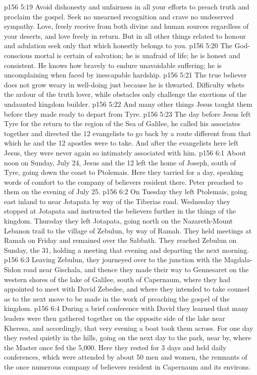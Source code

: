 \vs p156 5:19 Avoid dishonesty and unfairness in all your efforts to preach truth and proclaim the gospel. Seek no unearned recognition and crave no undeserved sympathy. Love, freely receive from both divine and human sources regardless of your deserts, and love freely in return. But in all other things related to honour and adulation seek only that which honestly belongs to you.
\vs p156 5:20 The God\hyp{}conscious mortal is certain of salvation; he is unafraid of life; he is honest and consistent. He knows how bravely to endure unavoidable suffering; he is uncomplaining when faced by inescapable hardship.
\vs p156 5:21 The true believer does not grow weary in well\hyp{}doing just because he is thwarted. Difficulty whets the ardour of the truth lover, while obstacles only challenge the exertions of the undaunted kingdom builder.
\vs p156 5:22 \pc And many other things Jesus taught them before they made ready to depart from Tyre.
\vs p156 5:23 The day before Jesus left Tyre for the return to the region of the Sea of Galilee, he called his associates together and directed the 12 evangelists to go back by a route different from that which he and the 12 apostles were to take. And after the evangelists here left Jesus, they were never again so intimately associated with him.
\vs p156 6:1 About noon on Sunday, July 24, Jesus and the 12 left the home of Joseph, south of Tyre, going down the coast to Ptolemais. Here they tarried for a day, speaking words of comfort to the company of believers resident there. Peter preached to them on the evening of July 25.
\vs p156 6:2 On Tuesday they left Ptolemais, going east inland to near Jotapata by way of the Tiberias road. Wednesday they stopped at Jotapata and instructed the believers further in the things of the kingdom. Thursday they left Jotapata, going north on the Nazareth\hyp{}Mount Lebanon trail to the village of Zebulun, by way of Ramah. They held meetings at Ramah on Friday and remained over the Sabbath. They reached Zebulun on Sunday, the 31, holding a meeting that evening and departing the next morning.
\vs p156 6:3 Leaving Zebulun, they journeyed over to the junction with the Magdala\hyp{}Sidon road near Gischala, and thence they made their way to Gennesaret on the western shores of the lake of Galilee, south of Capernaum, where they had appointed to meet with David Zebedee, and where they intended to take counsel as to the next move to be made in the work of preaching the gospel of the kingdom.
\vs p156 6:4 During a brief conference with David they learned that many leaders were then gathered together on the opposite side of the lake near Kheresa, and accordingly, that very evening a boat took them across. For one day they rested quietly in the hills, going on the next day to the park, near by, where the Master once fed the 5,000. Here they rested for 3 days and held daily conferences, which were attended by about 50 men and women, the remnants of the once numerous company of believers resident in Capernaum and its environs.

